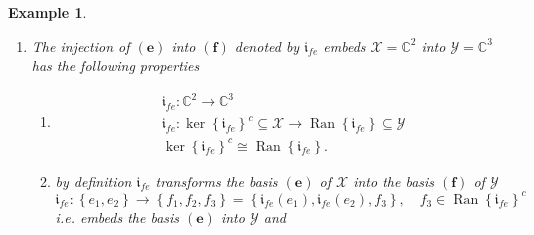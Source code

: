 \documentclass[aps,preprint]{revtex4}%
\newtheorem{example}[theorem]{Example}
\begin{document}
\begin{example}
\begin{enumerate}
\item The injection of $\left(  \mathbf{e}\right)  $ into $\left(
\mathbf{f}\right)  $ denoted by $\mathfrak{i}_{fe}$ embeds $\mathcal{X}%
=\mathbb{C}^{2}$ into $\mathcal{Y}=\mathbb{C}^{3}$ has the following properties

\begin{enumerate}
\item
\begin{gather}
\mathfrak{i}_{fe}:\mathbb{C}^{2}\rightarrow\mathbb{C}^{3}\\
\mathfrak{i}_{fe}:\ker\left\{  \mathfrak{i}_{fe}\right\}  ^{c}\subseteq
\mathcal{X}\rightarrow\operatorname{Ran}\left\{  \mathfrak{i}_{fe}\right\}
\subseteq\mathcal{Y}\\
\ker\left\{  \mathfrak{i}_{fe}\right\}  ^{c}\cong\operatorname{Ran}\left\{
\mathfrak{i}_{fe}\right\}  .
\end{gather}


\item by \emph{definition} $\mathfrak{i}_{fe}$ transforms the basis $\left(
\mathbf{e}\right)  $ of $\mathcal{X}$ into the basis $\left(  \mathbf{f}%
\right)  $ of $\mathcal{Y}$
\begin{equation}
\mathfrak{i}_{fe}:\left\{  e_{1},e_{2}\right\}  \rightarrow\left\{
f_{1},f_{2},f_{3}\right\}  =\left\{  \mathfrak{i}_{fe}\left(  e_{1}\right)
,\mathfrak{i}_{fe}\left(  e_{2}\right)  ,f_{3}\right\}  ,\quad f_{3}%
\in\operatorname{Ran}\left\{  \mathfrak{i}_{fe}\right\}  ^{c}%
\end{equation}
i.e. embeds the basis $\left(  \mathbf{e}\right)  $ into $\mathcal{Y}$ and


\end{enumerate}
\end{enumerate}
\end{example}
\end{document}
